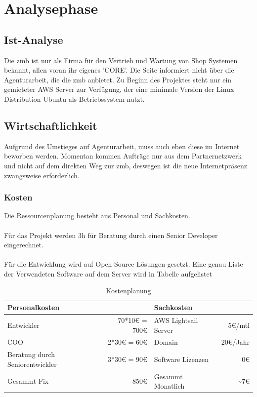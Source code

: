 \documentclass[11pt,a4paper]{article}
\begin{document}
\section{Analysephase}
\subsection{Ist-Analyse}
Die zmb ist nur als Firma für den Vertrieb und Wartung von Shop Systemen bekannt, allen voran ihr eigenes 'CORE'. Die Seite informiert nicht über die Agenturarbeit, die die zmb anbietet.
Zu Beginn des Projektes steht nur ein gemieteter AWS Server zur Verfügung, der eine minimale Version der Linux Distribution Ubuntu als Betriebssystem nutzt.
\subsection{Wirtschaftlichkeit}
Aufgrund des Umstieges auf Agenturarbeit, muss auch eben diese im Internet beworben werden. Momentan kommen Aufträge nur aus dem Partnernetzwerk und nicht auf dem direkten Weg zur zmb, deswegen ist die neue Internetpräsenz zwangsweise erforderlich.
\subsubsection{Kosten}
Die Ressourcenplanung besteht aus Personal und Sachkosten.\\\\
Für das Projekt werden 3h für Beratung durch einen Senior Developer eingerechnet.\\\\
Für die Entwicklung wird auf Open Source Lösungen gesetzt. Eine genau Liste der Verwendeten Software auf dem Server wird in Tabelle \pageref{sec:progs} aufgelistet
\begin{table}[!ht]
  \centering
     \begin{tabular}{l|r||l|r}
       \textbf{Personalkosten}  & &\textbf{Sachkosten}& \\
       \hline
       Entwickler      &    70*10€ = 700€    &  AWS Lightsail Server      &     5€/mtl\\
       COO    &  2*30€ = 60€               	    &  Domain & 20€/Jahr\\
       Beratung durch Seniorentwickler    &  3*30€ = 90€ & Software Lizenzen & 0€	\\
       \hline
       \hline
       Gesammt Fix& 850€ & Gesammt Monatlich & \textasciitilde 7€  \\
     \end{tabular}
\caption{Kostenplanung}
\label{tbl:Kostenplanung}
\end{table}
\end{document}
